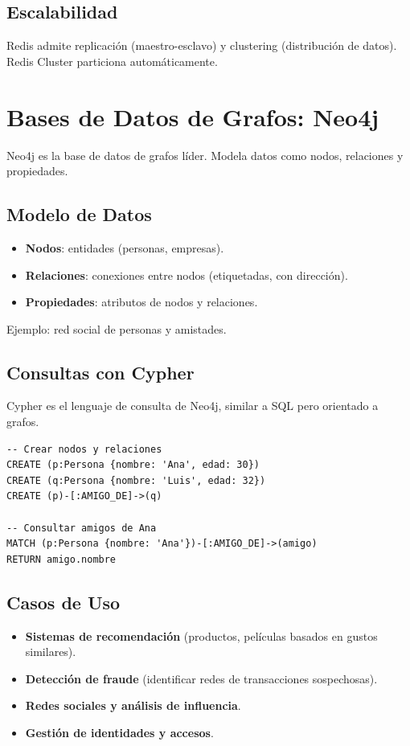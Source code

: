 \documentclass[12pt,a4paper,openany,oneside]{book}
\begin{document}
\section{Escalabilidad}
Redis admite replicación (maestro-esclavo) y clustering (distribución de datos). Redis Cluster particiona automáticamente.

\chapter{Bases de Datos de Grafos: Neo4j}
Neo4j es la base de datos de grafos líder. Modela datos como nodos, relaciones y propiedades.

\section{Modelo de Datos}
\begin{itemize}
    \item \textbf{Nodos}: entidades (personas, empresas).
    \item \textbf{Relaciones}: conexiones entre nodos (etiquetadas, con dirección).
    \item \textbf{Propiedades}: atributos de nodos y relaciones.
\end{itemize}
Ejemplo: red social de personas y amistades.

\section{Consultas con Cypher}
Cypher es el lenguaje de consulta de Neo4j, similar a SQL pero orientado a grafos.
\begin{lstlisting}[language=Cypher]
-- Crear nodos y relaciones
CREATE (p:Persona {nombre: 'Ana', edad: 30})
CREATE (q:Persona {nombre: 'Luis', edad: 32})
CREATE (p)-[:AMIGO_DE]->(q)

-- Consultar amigos de Ana
MATCH (p:Persona {nombre: 'Ana'})-[:AMIGO_DE]->(amigo)
RETURN amigo.nombre
\end{lstlisting}

\section{Casos de Uso}
\begin{itemize}
    \item \textbf{Sistemas de recomendación} (productos, películas basados en gustos similares).
    \item \textbf{Detección de fraude} (identificar redes de transacciones sospechosas).
    \item \textbf{Redes sociales y análisis de influencia}.
    \item \textbf{Gestión de identidades y accesos}.
\end{itemize}
\end{document}

